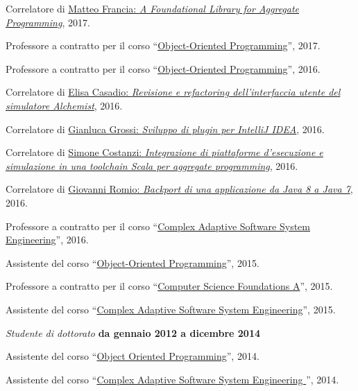 \documentclass[10pt]{article}
\newenvironment{outerlist}[1][\enskip\textbullet]%
        {\begin{itemize}[#1]}{\end{itemize}%
         \vspace{-.6\baselineskip}}
\newenvironment{innerlist}[1][\enskip\textbullet]%
        {\begin{compactitem}[#1]}{\end{compactitem}}
\begin{document}
\begin{outerlist}
\begin{innerlist}
      \item Correlatore di \href{http://amslaurea.unibo.it/13090/}{Matteo Francia: \textit{A Foundational Library for Aggregate Programming}}, 2017.
      \item Professore a contratto per il corso ``\href{http://apice.unibo.it/xwiki/bin/view/Courses/OOP1718}{Object-Oriented Programming}'', 2017.
      \item Professore a contratto per il corso ``\href{http://apice.unibo.it/xwiki/bin/view/Courses/OOP1617}{Object-Oriented Programming}'', 2016.
      \item Correlatore di \href{http://amslaurea.unibo.it/12310/}{Elisa Casadio: \textit{Revisione e refactoring dell'interfaccia utente del simulatore Alchemist}}, 2016.
      \item Correlatore di \href{http://amslaurea.unibo.it/12503/}{Gianluca Grossi: \textit{Sviluppo di plugin per IntelliJ IDEA}}, 2016.
      \item Correlatore di \href{http://amslaurea.unibo.it/10519/}{Simone Costanzi: \textit{Integrazione di piattaforme d'esecuzione e simulazione in una toolchain Scala per aggregate programming}}, 2016.
      \item Correlatore di \href{http://amslaurea.unibo.it/10481/}{Giovanni Romio: \textit{Backport di una applicazione da Java 8 a Java 7}}, 2016.
      \item Professore a contratto per il corso ``\href{http://apice.unibo.it/xwiki/bin/view/Courses/ISAC1516}{Complex Adaptive Software System Engineering}'', 2016.
      \item Assistente del corso ``\href{http://apice.unibo.it/xwiki/bin/view/Courses/OOP1516}{Object-Oriented Programming}'', 2015.
      \item Professore a contratto per il corso ``\href{http://www.apice.unibo.it/xwiki/bin/view/Courses/FINFA1415/}{Computer Science Foundations A}'', 2015.
      \item Assistente del corso ``\href{http://apice.unibo.it/xwiki/bin/view/Courses/ISAC1415}{Complex Adaptive Software System Engineering}'', 2015.
    \end{innerlist}
\item[] \textit{Studente di dottorato} \hfill \textbf{da gennaio 2012 a dicembre 2014}
    \begin{innerlist}
      \item Assistente del corso ``\href{http://apice.unibo.it/xwiki/bin/view/Courses/OOP1415}{Object Oriented Programming}'', 2014.
      \item Assistente del corso ``\href{http://apice.unibo.it/xwiki/bin/view/Courses/ISAC1314}{Complex Adaptive Software System Engineering }'', 2014.

\end{innerlist}
\end{outerlist}
\end{document}
